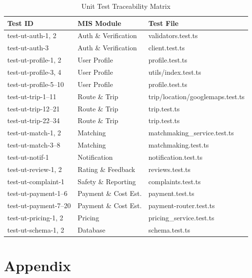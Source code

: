 \documentclass[12pt, titlepage]{article}
\begin{document}
\begin{table}[H]
\centering
\caption{Unit Test Traceability Matrix}
\label{tab:unit-trace}
\begin{tabular}{|l|l|l|}
\hline
\textbf{Test ID} & \textbf{MIS Module} & \textbf{Test File} \\ \hline
test-ut-auth-1, 2 & Auth \& Verification & validators.test.ts \\ \hline
test-ut-auth-3 & Auth \& Verification & client.test.ts \\ \hline
test-ut-profile-1, 2 & User Profile & profile.test.ts \\ \hline
test-ut-profile-3, 4 & User Profile & utils/index.test.ts \\ \hline
test-ut-profile-5--10 & User Profile & profile.test.ts \\ \hline
test-ut-trip-1--11 & Route \& Trip & trip/location/googlemaps.test.ts \\ \hline
test-ut-trip-12--21 & Route \& Trip & trip.test.ts \\ \hline
test-ut-trip-22--34 & Route \& Trip & trip.test.ts \\ \hline
test-ut-match-1, 2 & Matching & matchmaking\_service.test.ts \\ \hline
test-ut-match-3--8 & Matching & matchmaking.test.ts \\ \hline
test-ut-notif-1 & Notification & notification.test.ts \\ \hline
test-ut-review-1, 2 & Rating \& Feedback & reviews.test.ts \\ \hline
test-ut-complaint-1 & Safety \& Reporting & complaints.test.ts \\ \hline
test-ut-payment-1--6 & Payment \& Cost Est. & payment.test.ts \\ \hline
test-ut-payment-7--20 & Payment \& Cost Est. & payment-router.test.ts \\ \hline
test-ut-pricing-1, 2 & Pricing & pricing\_service.test.ts \\ \hline
test-ut-schema-1, 2 & Database & schema.test.ts \\ \hline
\end{tabular}
\end{table}





\newpage

\section{Appendix}
\end{document}
